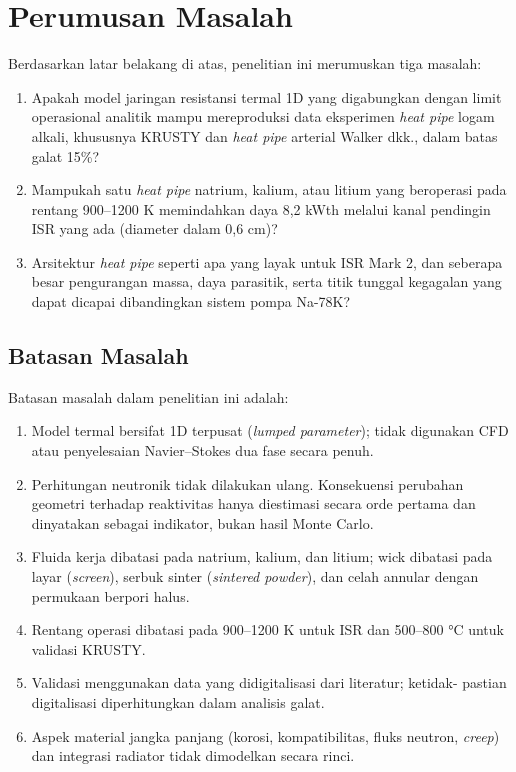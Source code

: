 \documentclass[
  indonesian,
  12pt,
  a4paper,
]{report}
\providecommand{\tightlist}{%
  \setlength{\itemsep}{0pt}\setlength{\parskip}{0pt}}
\begin{document}
\section{Perumusan Masalah}\label{perumusan-masalah}

Berdasarkan latar belakang di atas, penelitian ini merumuskan tiga
masalah:

\begin{enumerate}
\def\labelenumi{\arabic{enumi}.}
\tightlist
\item
  Apakah model jaringan resistansi termal 1D yang digabungkan dengan
  limit operasional analitik mampu mereproduksi data eksperimen
  \emph{heat pipe} logam alkali, khususnya KRUSTY dan \emph{heat pipe}
  arterial Walker dkk., dalam batas galat 15\%?
\item
  Mampukah satu \emph{heat pipe} natrium, kalium, atau litium yang
  beroperasi pada rentang 900--1200 K memindahkan daya 8,2 kWth melalui
  kanal pendingin ISR yang ada (diameter dalam 0,6 cm)?
\item
  Arsitektur \emph{heat pipe} seperti apa yang layak untuk ISR Mark 2,
  dan seberapa besar pengurangan massa, daya parasitik, serta titik
  tunggal kegagalan yang dapat dicapai dibandingkan sistem pompa Na-78K?
\end{enumerate}

\subsection{Batasan Masalah}\label{batasan-masalah}

Batasan masalah dalam penelitian ini adalah:

\begin{enumerate}
\def\labelenumi{\arabic{enumi}.}
\tightlist
\item
  Model termal bersifat 1D terpusat (\emph{lumped parameter}); tidak
  digunakan CFD atau penyelesaian Navier--Stokes dua fase secara penuh.
\item
  Perhitungan neutronik tidak dilakukan ulang. Konsekuensi perubahan
  geometri terhadap reaktivitas hanya diestimasi secara orde pertama dan
  dinyatakan sebagai indikator, bukan hasil Monte Carlo.
\item
  Fluida kerja dibatasi pada natrium, kalium, dan litium; wick dibatasi
  pada layar (\emph{screen}), serbuk sinter (\emph{sintered powder}),
  dan celah annular dengan permukaan berpori halus.
\item
  Rentang operasi dibatasi pada 900--1200 K untuk ISR dan 500--800 °C
  untuk validasi KRUSTY.
\item
  Validasi menggunakan data yang didigitalisasi dari literatur; ketidak-
  pastian digitalisasi diperhitungkan dalam analisis galat.
\item
  Aspek material jangka panjang (korosi, kompatibilitas, fluks neutron,
  \emph{creep}) dan integrasi radiator tidak dimodelkan secara rinci.
\end{enumerate}
\end{document}
